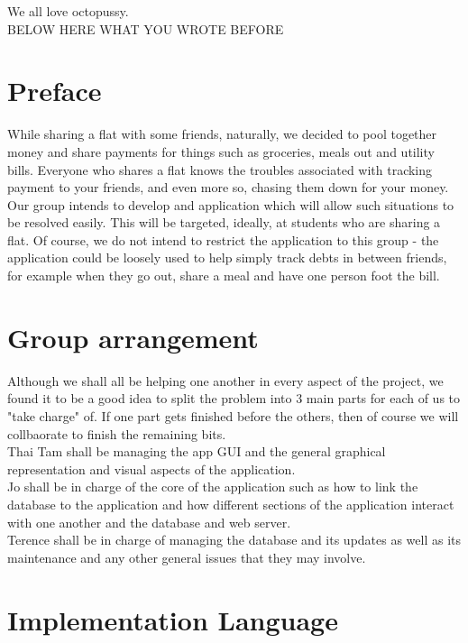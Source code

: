 \documentclass[a4paper,11pt]{article}
\begin{document}
We all love octopussy.\\


BELOW HERE WHAT YOU WROTE BEFORE\\


\section*{Preface}
While sharing a flat with some friends, naturally, we decided to pool together money and share payments for things such as groceries, meals out and utility bills. Everyone who shares a flat knows the troubles associated with tracking payment to your friends, and even more so, chasing them down for your money. Our group intends to develop and application which will allow such situations to be resolved easily. This will be targeted, ideally, at students who are sharing a flat. Of course, we do not intend to restrict the application to this group - the application could be loosely used to help simply track debts in between friends, for example when they go out, share a meal and have one person foot the bill.

\section*{Group arrangement}
Although we shall all be helping one another in every aspect of the project, we found it to be a good idea to split the problem into 3 main parts for each of us to "take charge" of. If one part gets finished before the others, then of course we will collbaorate to finish the remaining bits.\\ 
Thai Tam shall be managing the app GUI and the general graphical representation and visual aspects of the application.\\
Jo shall be in charge of the core of the application such as how to link the database to the application and how different sections of the application interact with one another and the database and web server.\\
Terence shall be in charge of managing the database and its updates as well as its maintenance and any other general issues that they may involve.

\section*{Implementation Language}
\end{document}
